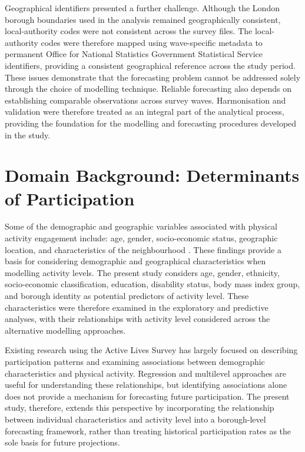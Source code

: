 \documentclass[ %
                    author={Ashrey Ashrey, Sanya Kapoor, Trisha Sharma, Yash Bhooshan Pandloskar},
                supervisor={Dr. Dalila O’Grady},
                    degree={MSc},
                     title={Using machine learning to forecast physical activity participation, volunteering and activity patterns in London},
                  subtitle={},
                      type={},
                      year={2021}]{dissertation}
\begin{document}
Geographical identifiers presented a further challenge. Although the London borough boundaries used in the analysis remained geographically consistent, local-authority codes were not consistent across the survey files. The local-authority codes were therefore mapped using wave-specific metadata to permanent Office for National Statistics Government Statistical Service identifiers, providing a consistent geographical reference across the study period. These issues demonstrate that the forecasting problem cannot be addressed solely through the choice of modelling technique. Reliable forecasting also depends on establishing comparable observations across survey waves. Harmonisation and validation were therefore treated as an integral part of the analytical process, providing the foundation for the modelling and forecasting procedures developed in the study.

\section{Domain Background: Determinants of Participation}

Some of the demographic and geographic variables associated with physical activity engagement include: age, gender, socio-economic status, geographic location, and characteristics of the neighbourhood \cite{brainard_etal_2019,brinkley_etal_2024,davis_etal_2011}. These findings provide a basis for considering demographic and geographical characteristics when modelling activity levels. The present study considers age, gender, ethnicity, socio-economic classification, education, disability status, body mass index group, and borough identity as potential predictors of activity level. These characteristics were therefore examined in the exploratory and predictive analyses, with their relationships with activity level considered across the alternative modelling approaches.

Existing research using the Active Lives Survey has largely focused on describing participation patterns and examining associations between demographic characteristics and physical activity. Regression and multilevel approaches are useful for understanding these relationships, but identifying associations alone does not provide a mechanism for forecasting future participation. The present study, therefore, extends this perspective by incorporating the relationship between individual characteristics and activity level into a borough-level forecasting framework, rather than treating historical participation rates as the sole basis for future projections.
\end{document}
